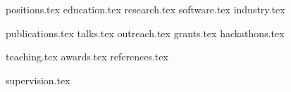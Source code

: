 \documentclass[letterpaper,11pt]{article}
\begin{document}


{positions.tex}
{education.tex}
{research.tex}
{software.tex}
{industry.tex}



{{publications.tex}}
{{talks.tex}}
{{outreach.tex}}
{{grants.tex}}
{{hackathons.tex}}


{teaching.tex}
{awards.tex}
{references.tex}


{supervision.tex}
\end{document}
